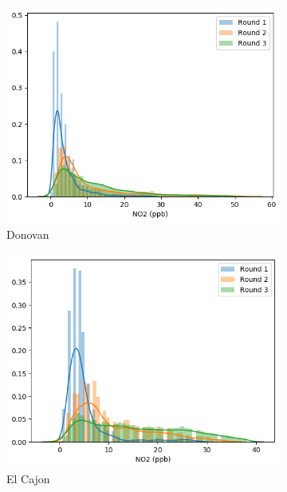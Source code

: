\documentclass[journal abbreviation, manuscript]{copernicus}
\begin{document}
\begin{figure}[H]
\centering
\begin{subfigure}{0.32\textwidth}
\includegraphics[width=\textwidth]{results/distributions/location_donovan_no2.png}
\caption{Donovan}
\end{subfigure}
\begin{subfigure}{0.32\textwidth}
\includegraphics[width=\textwidth]{results/distributions/location_elcajon_no2.png}
\caption{El Cajon}
\end{subfigure}
\begin{subfigure}{0.32\textwidth}

\end{subfigure}
\end{figure}
\end{document}
